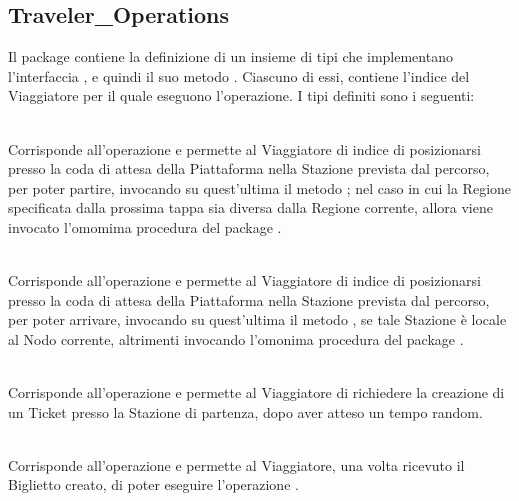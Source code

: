 	\subsection{Traveler\_Operations}
	
	Il package  contiene la definizione di un insieme di tipi  che implementano l'interfaccia , e quindi il suo metodo . Ciascuno di essi, contiene l'indice del Viaggiatore  per il quale eseguono l'operazione. I tipi definiti sono i seguenti:
	
	\begin{description}
		
		\item {}\\
		Corrisponde all'operazione  e permette al Viaggiatore di indice  di posizionarsi presso la coda di attesa della Piattaforma nella Stazione prevista dal percorso, per poter partire, invocando su quest'ultima il metodo ; nel caso in cui la Regione specificata dalla prossima tappa sia diversa dalla Regione corrente, allora viene invocato l'omomima procedura del package .
		
		\item {}\\
		Corrisponde all'operazione  e permette al Viaggiatore di indice  di posizionarsi presso la coda di attesa della Piattaforma nella Stazione prevista dal percorso, per poter arrivare, invocando su quest'ultima il metodo , se tale Stazione è locale al Nodo corrente, altrimenti invocando l'omonima procedura del package .
		
		\item {}\\
		Corrisponde all'operazione  e permette al Viaggiatore di richiedere la creazione di un Ticket presso la Stazione di partenza, dopo aver atteso un tempo random.
		
		\item {}\\
		Corrisponde all'operazione  e permette al Viaggiatore, una volta ricevuto il Biglietto creato, di poter eseguire l'operazione . 
		 
	\end{description}
	
	
